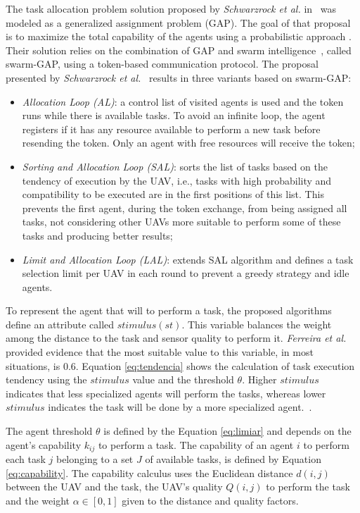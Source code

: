 The task allocation problem solution proposed by \textit{Schwarzrock et al.} in~\cite{MAS07} was modeled as a generalized assignment problem (GAP)\cite{ferreira2007swarm}. The goal of that proposal is to maximize the total capability of the agents using a probabilistic approach \cite{theraulaz1998response}. Their solution relies on the combination of GAP and swarm intelligence~\cite{MOEA07}, called swarm-GAP, using a token-based communication protocol. The proposal presented by \textit{Schwarzrock et al.}~\cite{MAS07} results in three variants based on swarm-GAP:

\begin{itemize}
   \item \textit{Allocation Loop (AL)}: a control list of visited agents is used and the token runs while there is available tasks. To avoid an infinite loop, the agent registers if it has any resource available to perform a new task before resending the token. Only an agent with free resources will receive the token;
   \item \textit{Sorting and Allocation Loop (SAL)}: sorts the list of tasks based on the tendency of execution by the UAV, i.e., tasks with high probability and compatibility to be executed are in the first positions of this list. This prevents the first agent, during the token exchange, from being assigned all tasks, not considering other UAVs more suitable to perform some of these tasks and producing better results; 
   \item \textit{Limit and Allocation Loop (LAL)}: extends SAL algorithm and defines a task selection limit per UAV in each round to prevent a greedy strategy and idle agents.
\end{itemize}

To represent the agent that will to perform a task, the proposed algorithms define an attribute called $stimulus (st)$. This variable balances the weight among the distance to the task and sensor quality to perform it. \textit{Ferreira et al.}~\cite{ferreira2007swarm} provided evidence that the most suitable value to this variable, in most situations, is $0.6$. Equation \ref{eq:tendencia} shows the calculation of task execution tendency using the $stimulus$ value and the threshold $\theta$. Higher $stimulus$ indicates that less specialized agents will perform the tasks, whereas lower $stimulus$ indicates the task will be done by a more specialized agent.~\cite{bonabeau1999swarm}. 

The agent threshold $\theta$ is defined by the Equation \ref{eq:limiar} and depends on the agent's capability $k_{ij}$ to perform a task. The capability of an agent $i$ to perform each task $j$ belonging to a set $J$ of available tasks, is defined by Equation \ref{eq:capability}. The capability calculus uses the Euclidean distance $d(i,j)$ between the UAV and the task, the UAV's quality $Q(i,j)$ to perform the task and the weight $\alpha \in [0,1]$ given to the distance and quality factors. 


